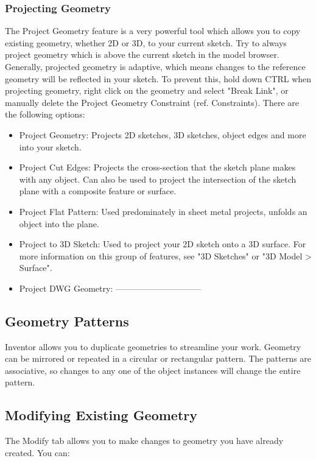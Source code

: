 \subsubsection{Projecting Geometry}
The Project Geometry feature is a very powerful tool which allows you to copy existing geometry, whether 2D or 3D, to your current sketch. Try to always project geometry which is above the current sketch in the model browser. Generally, projected geometry is adaptive, which means changes to the reference geometry will be reflected in your sketch. To prevent this, hold down CTRL when projecting geometry, right click on the geometry and select "Break Link", or manually delete the Project Geometry Constraint (ref. Constraints). There are the following options:

\begin{itemize}
\item Project Geometry: Projects 2D sketches, 3D sketches, object edges and more into your sketch.
\item Project Cut Edges: Projects the cross-section that the sketch plane makes with any object. Can also be used to project the intersection of the sketch plane with a composite feature or surface.
\item Project Flat Pattern: Used predominately in sheet metal projects, unfolds an object into the plane.
\item Project to 3D Sketch: Used to project your 2D sketch onto a 3D surface. For more information on this group of features, see "3D Sketches" or "3D Model > Surface".
\item Project DWG Geometry:  ------------------------------
\end{itemize}

\subsection{Geometry Patterns}
Inventor allows you to duplicate geometries to streamline your work. Geometry can be mirrored or repeated in a circular or rectangular pattern. The patterns are associative, so changes to any one of the object instances will change the entire pattern.

\subsection{Modifying Existing Geometry}
The Modify tab allows you to make changes to geometry you have already created. You can:

